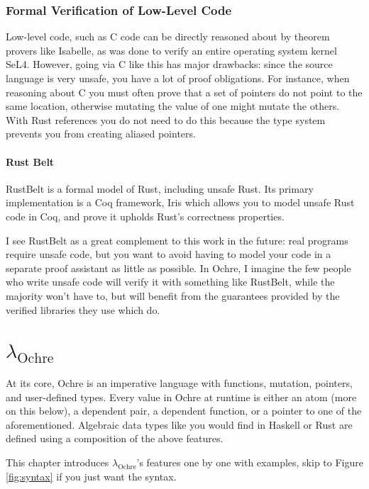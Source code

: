 \documentclass[12pt,twoside]{report}
\newcommand{\lochre}{$\lambda_\text{Ochre}$}
\begin{document}
\subsection{Formal Verification of Low-Level Code}
Low-level code, such as C code can be directly reasoned about by theorem provers like Isabelle, as was done to verify an entire operating system kernel SeL4\cite{klein_sel4_2009}. However, going via C like this has major drawbacks: since the source language is very unsafe, you have a lot of proof obligations. For instance, when reasoning about C you must often prove that a set of pointers do not point to the same location, otherwise mutating the value of one might mutate the others. With Rust references you do not need to do this because the type system prevents you from creating aliased pointers.

\subsubsection{Rust Belt}
RustBelt\cite{jung_rustbelt_2018} is a formal model of Rust, including unsafe Rust. Its primary implementation is a Coq framework, Iris\cite{noauthor_iris_nodate} which allows you to model unsafe Rust code in Coq, and prove it upholds Rust's correctness properties.

I see RustBelt as a great complement to this work in the future: real programs require unsafe code, but you want to avoid having to model your code in a separate proof assistant as little as possible. In Ochre, I imagine the few people who write unsafe code will verify it with something like RustBelt, while the majority won't have to, but will benefit from the guarantees provided by the verified libraries they use which do.

\chapter{\lochre{}}

At its core, Ochre is an imperative language with functions, mutation, pointers, and user-defined types. Every value in Ochre at runtime is either an atom (more on this below), a dependent pair, a dependent function, or a pointer to one of the aforementioned. Algebraic data types like you would find in Haskell or Rust are defined using a composition of the above features.

This chapter introduces \lochre{}'s features one by one with examples, skip to Figure \ref{fig:syntax} if you just want the syntax.
\end{document}
